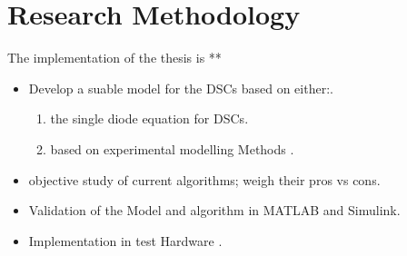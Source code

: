 \section{Research Methodology}
The implementation of the thesis is ** 
\begin{itemize}
\item Develop a suable model for the \ac{DSCs} based on either:.
	\begin{enumerate}
		\item the single diode equation for \ac{DSCs}.
		\item based on experimental modelling Methods .
	\end{enumerate}
\item objective study of current algorithms;  weigh their pros vs cons.
\item Validation of the Model and algorithm in MATLAB{\textregistered} and Simulink{\textregistered}.
\item Implementation in test Hardware .
\end {itemize}